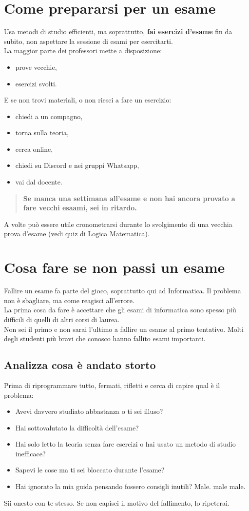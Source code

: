 \documentclass[18pt]{extarticle}
\begin{document}
\section{Come prepararsi per un esame}
Usa metodi di studio efficienti, ma soprattutto, \textbf{fai esercizi d'esame} fin da subito, non aspettare la sessione di esami per esercitarti.\\
La maggior parte dei professori mette a disposizione:
\begin{itemize}
\item prove vecchie,
\item esercizi svolti.
\end{itemize}
E se non trovi materiali, o non riesci a fare un esercizio:
\begin{itemize}
\item chiedi a un compagno,
\item torna sulla teoria,
\item cerca online,
\item chiedi su Discord e nei gruppi Whatsapp,
\item vai dal docente.
\end{itemize}
\begin{quote}
\textbf{Se manca una settimana all'esame e non hai ancora provato a fare vecchi esaami, sei in ritardo.}
\end{quote}
A volte può essere utile cronometrarsi durante lo svolgimento di una vecchia prova d'esame (vedi quiz di Logica Matematica).

\clearpage
\section{Cosa fare se non passi un esame}
Fallire un esame fa parte del gioco, soprattutto qui ad Informatica. Il problema non è sbagliare, ma come reagisci all'errore.\\
La prima cosa da fare è accettare che gli esami di informatica sono spesso più difficili di quelli di altri corsi di laurea.\\
Non sei il primo e non sarai l'ultimo a fallire un esame al primo tentativo.  
Molti degli studenti più bravi che conosco hanno fallito esami importanti.


\subsection{Analizza cosa è andato storto}
Prima di riprogrammare tutto, fermati, rifletti e cerca di capire qual è il problema:
\begin{itemize}
\item Avevi davvero studiato abbastanza o ti sei illuso?
\item Hai sottovalutato la difficoltà dell'esame?
\item Hai solo letto la teoria senza fare esercizi o hai usato un metodo di studio inefficace?
\item Sapevi le cose ma ti sei bloccato durante l'esame?
\item Hai ignorato la mia guida pensando fossero consigli inutili? Male. male male.
\end{itemize}
Sii onesto con te stesso. Se non capisci il motivo del fallimento, lo ripeterai.
\end{document}
